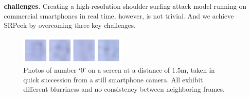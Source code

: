 \vspace{1mm}
\noindent
\textbf{challenges.} Creating a high-resolution shoulder surfing attack model running on commercial smartphones in real time, however, is not trivial. And we achieve \textsf{SRPeek} by overcoming three key challenges.
\begin{figure}
	\centering
	\includegraphics[width=0.48\textwidth]{pic/zeros.png}
    \caption{Photos of number ‘0’ on a screen at a distance of 1.5m, taken in quick succession from a still smartphone camera. All exhibit different blurriness and no consistency between neighboring frames.}
	\label{fig-zeros}
\end{figure}

